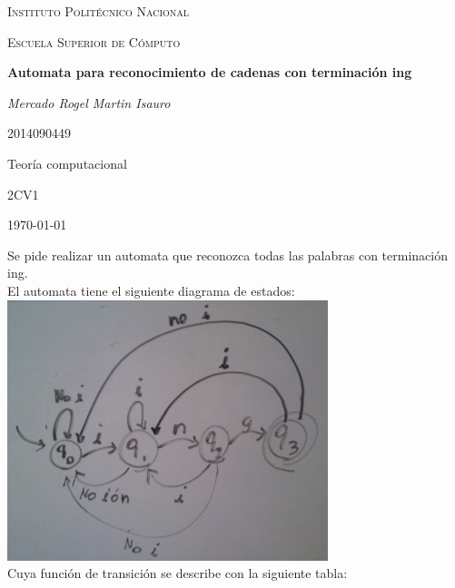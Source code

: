 \documentclass[spanish]{article}
\begin{document}
\begin{titlepage}

\centering
	\vspace{1cm}
	{\scshape\LARGE Instituto Politécnico Nacional \par}
	\vspace{0.7cm}
	{\scshape\Large Escuela Superior de Cómputo\par}
	\vspace{1.5cm}
	{\huge\bfseries Automata para reconocimiento de cadenas con terminación ing\par}
	\vspace{2cm}
	{\Large\itshape Mercado Rogel Martin Isauro\par}
	\vspace{0.7cm}
	{\large 2014090449\par}
	\vspace{0.7cm}
	{\large Teoría computacional\par}
	\vspace{0.7cm}
	{\large 2CV1\par}
	\vfill

	\vfill

	{\large \today\par}
\end{titlepage}
Se pide realizar un automata que reconozca todas las palabras con terminación ing.\\
El automata tiene el siguiente diagrama de estados:\\
\includegraphics[width=0.7\textwidth]{diagrama.jpeg}\\
Cuya función de transición se describe con la siguiente tabla:\\
\end{document}
